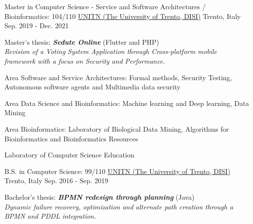 

\begin{cventries}

\cventry
{Master in Computer Science - Service and Software Architectures / Bioinformatics: 104/110} %
{\href{https://www.unitn.it/}{UNITN (The University of Trento, DISI)}}  %
{Trento, Italy} %
{Sep. 2019 - Dec. 2021} %
{
  \begin{cvitems} %
    \item {Master's thesis: \textbf{\textit{Sedute Online}} (Flutter and PHP)\\\textit{Revision of a Voting System Application through Cross-platform mobile framework with a focus on Security and Performance.}}
    \item {Area Software and Service Architectures: Formal methods, Security Testing, Autonomous software agents and Multimedia data security}
    \item {Area Data Science and Bioinformatics: Machine learning and Deep learning, Data Mining}
    \item {Area Bioinformatics: Laboratory of Biological Data Mining, Algorithms for Bioinformatics and Bioinformatics Resources}
    \item {Laboratory of Computer Science Education}
  \end{cvitems}
}

\cventry
{B.S. in Computer Science: 99/110} %
{\href{https://www.unitn.it/}{UNITN (The University of Trento, DISI)}}  %
{Trento, Italy} %
{Sep. 2016 - Sep. 2019} %
{
  \begin{cvitems} %
    \item {Bachelor's thesis: \textbf{\textit{BPMN redesign through planning}} (Java)\\\textit{Dynamic failure recovery, optimization and alternate path creation through a BPMN and PDDL integration.}}
  \end{cvitems}
}

\end{cventries}
